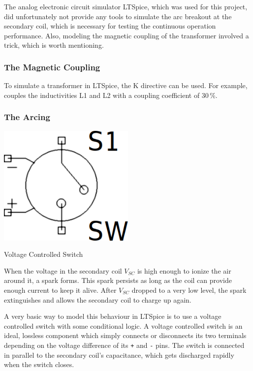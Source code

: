 The analog electronic circuit simulator LTSpice, which was used for this project, did unfortunately not provide any tools to simulate the arc breakout at the secondary coil, which is necessary for testing the continuous operation performance. Also, modeling the magnetic coupling of the transformer involved a trick, which is worth mentioning.

\subsubsection{The Magnetic Coupling}


To simulate a transformer in LTSpice, the K directive can be used. For example,  couples the inductivities L1 and L2 with a coupling coefficient of 30\,\%.

\subsubsection{The Arcing}

\begin{marginfigure}[5mm]
    \centering
    \includegraphics[width=0.5\textwidth]{simon/resources/ltspice_sw.png}
    \caption{Voltage Controlled Switch}
    \label{fig:ltspice_sw}
\end{marginfigure}

When the voltage in the secondary coil \(V_{SC}\) is high enough to ionize the air around it, a spark forms. This spark persists as long as the coil can provide enough current to keep it alive. After \(V_{SC}\) dropped to a very low level, the spark extinguishes and allows the secondary coil to charge up again.

A very basic way to model this behaviour in LTSpice is to use a voltage controlled switch with some conditional logic. A voltage controlled switch is an ideal, lossless component which simply connects or disconnects its two terminals depending on the voltage difference of its \texttt{+} and \texttt{-} pins. The switch is connected in parallel to the secondary coil's capacitance, which gets discharged rapidly when the switch closes.


